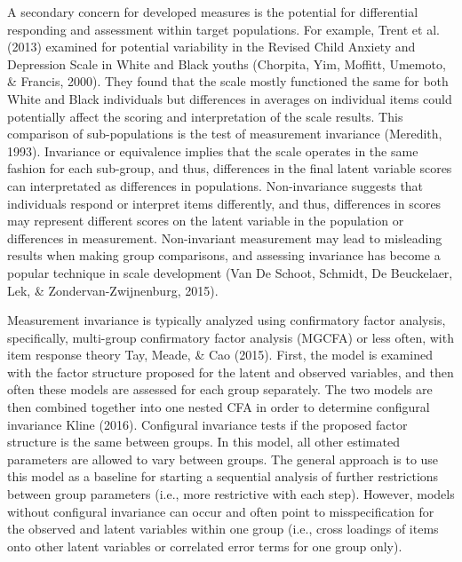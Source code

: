 \documentclass[
  man]{apa6}
\begin{document}
A secondary concern for developed measures is the potential for differential responding and assessment within target populations. For example, Trent et al. (2013) examined for potential variability in the Revised Child Anxiety and Depression Scale in White and Black youths (Chorpita, Yim, Moffitt, Umemoto, \& Francis, 2000). They found that the scale mostly functioned the same for both White and Black individuals but differences in averages on individual items could potentially affect the scoring and interpretation of the scale results. This comparison of sub-populations is the test of measurement invariance (Meredith, 1993). Invariance or equivalence implies that the scale operates in the same fashion for each sub-group, and thus, differences in the final latent variable scores can interpretated as differences in populations. Non-invariance suggests that individuals respond or interpret items differently, and thus, differences in scores may represent different scores on the latent variable in the population or differences in measurement. Non-invariant measurement may lead to misleading results when making group comparisons, and assessing invariance has become a popular technique in scale development (Van De Schoot, Schmidt, De Beuckelaer, Lek, \& Zondervan-Zwijnenburg, 2015).

Measurement invariance is typically analyzed using confirmatory factor analysis, specifically, multi-group confirmatory factor analysis (MGCFA) or less often, with item response theory Tay, Meade, \& Cao (2015). First, the model is examined with the factor structure proposed for the latent and observed variables, and then often these models are assessed for each group separately. The two models are then combined together into one nested CFA in order to determine configural invariance Kline (2016). Configural invariance tests if the proposed factor structure is the same between groups. In this model, all other estimated parameters are allowed to vary between groups. The general approach is to use this model as a baseline for starting a sequential analysis of further restrictions between group parameters (i.e., more restrictive with each step). However, models without configural invariance can occur and often point to misspecification for the observed and latent variables within one group (i.e., cross loadings of items onto other latent variables or correlated error terms for one group only).
\end{document}
